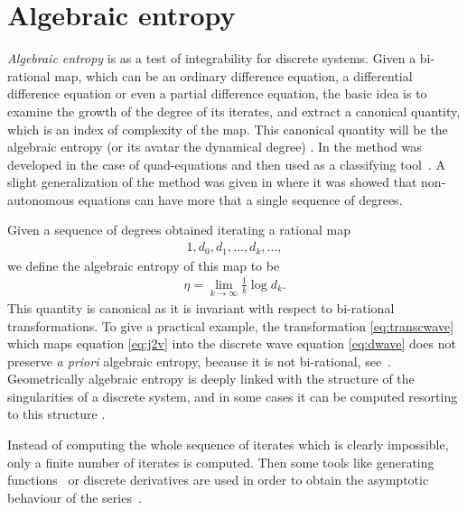 \documentclass[pdftex]{sigma}
\numberwithin{equation}{section}
\begin{document}
\section{Algebraic entropy}\label{sec:entropy}

\emph{Algebraic entropy} is as a test of integrability for discrete systems. Given a bi-rational map, which can be an ordinary dif\/ference equation, a dif\/ferential dif\/ference equation or even a partial dif\/ference equation, the basic idea is to examine the growth of the degree of its iterates, and extract a canonical quantity, which is an index of complexity of the map. This canonical quantity will be the algebraic entropy (or its avatar the dynamical degree) \cite{BellonViallet1999,Diller1996,FalquiViallet1993,Russakovskii1997,Veselov1992}. In \cite{Tremblay2001,Viallet2006} the method was developed in the case of quad-equations and then used as a classifying tool~\cite{HietarintaViallet2007}. A slight generalization of the method was given in \cite{GSL_general} where it was showed that non-autonomous equations can have more that a single sequence of degrees.

Given a sequence of degrees obtained iterating a rational map
\begin{gather*}
 1,d_{0},d_{1},\dots,d_{k},\dots, %
\end{gather*}
we def\/ine the algebraic entropy of this map to be
\begin{gather}
 \eta = \lim_{k\to\infty}\frac{1}{k}\log d_{k}.
 \label{eq:algentdef}
\end{gather}
This quantity is canonical as it is invariant with respect
to bi-rational transformations.
To give a practical example, the transformation \eqref{eq:transcwave}
which maps equation \eqref{eq:j2v} into the discrete
wave equation \eqref{eq:dwave} does not preserve
\emph{a priori} algebraic entropy, because it is not bi-rational,
see~\cite{Grammaticos2005}.
Geometrically algebraic entropy is deeply
linked with the structure of the singularities
of a discrete system, and in some cases
it can be computed resorting to this structure
\cite{DillerFavre2001,Sakai2001,Takenawa2001,Viallet2015}.

Instead of computing the whole
sequence of iterates which is clearly impossible,
only a f\/inite number of iterates is computed.
Then some tools like generating functions~\cite{Lando2003}
or discrete derivatives are used in order to obtain
the asymptotic behaviour of the series~\cite{GrammaticosHalburdRamaniViallet2009,GubbiottiASIDE16}.
\end{document}
